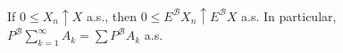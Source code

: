If $0 \leq X_n \uparrow X$ a.s., then $0 \leq E^{\mathcal{B}}X_n \uparrow E^{\mathcal{B}}X$ a.s. In particular, $P^{\mathcal{B}}\sum_{k=1}^{\infty} A_k = \sum P^{\mathcal{B}}A_k$ a.s.
